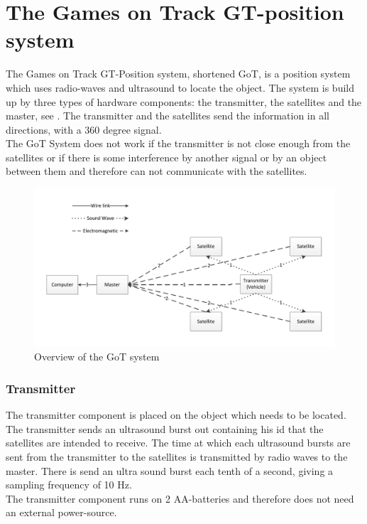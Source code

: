 \section{The Games on Track GT-position system}
\label{GoTDescription}
The Games on Track GT-Position system, shortened GoT, is a position system which uses radio-waves and ultrasound to locate the object. The system is build up by three types of hardware components: the transmitter, the satellites and the master, see . The transmitter and the satellites send the information in all directions, with a 360 degree signal.\\
The GoT System does not work if the transmitter is not close enough from the satellites or if there is some interference by another signal or by an object between them and therefore can not communicate with the satellites.

\begin{figure}[H]
	\centering
	\includegraphics[scale=0.6]{figures/GoT_description.pdf}
	\caption{Overview of the GoT system}
	\label{GoTSystem}
\end{figure}

\subsubsection{Transmitter}
The transmitter component is placed on the object which needs to be located. The transmitter sends an ultrasound burst out containing his id that the satellites are intended to receive. The time at which each ultrasound bursts are sent from the transmitter to the satellites is transmitted by radio waves to the master. There is send an ultra sound burst each tenth of a second, giving a sampling frequency of 10 Hz.\\ 
The transmitter component runs on 2 AA-batteries and therefore does not need an external power-source.\\

